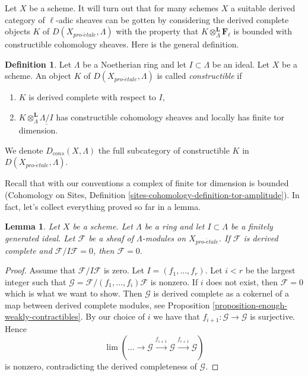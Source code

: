 \documentclass[10pt,a4paper]{amsart}
\theoremstyle{plain}
\newtheorem{lemma}[subsection]{Lemma}
\theoremstyle{definition}
\newtheorem{definition}[subsection]{Definition}
\theoremstyle{remark}
\numberwithin{equation}{subsection}
\def\lim{\mathop{\mathrm{lim}}\nolimits}
\def\proetale{{pro\text{-}\acute{e}tale}}
\begin{document}
\noindent
Let $X$ be a scheme. It will turn out that for many schemes $X$ a suitable
derived category of $\ell$-adic sheaves can be gotten by considering the
derived complete objects $K$ of $D(X_\proetale, \Lambda)$ with the property
that $K \otimes_\Lambda^\mathbf{L} \mathbf{F}_\ell$ is bounded with
constructible cohomology sheaves. Here is the general definition.

\begin{definition}
\label{definition-Dbc}
Let $\Lambda$ be a Noetherian ring and let $I \subset \Lambda$ be an ideal.
Let $X$ be a scheme. An object $K$ of $D(X_\proetale, \Lambda)$ is called
{\it constructible} if
\begin{enumerate}
\item $K$ is derived complete with respect to $I$,
\item $K \otimes_\Lambda^\mathbf{L} \underline{\Lambda/I}$
has constructible cohomology sheaves and locally has finite tor dimension.
\end{enumerate}
We denote $D_{cons}(X, \Lambda)$ the full subcategory of constructible
$K$ in $D(X_\proetale, \Lambda)$.
\end{definition}

\noindent
Recall that with our conventions a complex of finite tor dimension
is bounded (Cohomology on Sites, Definition
\ref{sites-cohomology-definition-tor-amplitude}).
In fact, let's collect everything proved so far in a lemma.

\begin{lemma}
\label{lemma-derived-complete-zero}
Let $X$ be a scheme. Let $\Lambda$ be a ring and let
$I \subset \Lambda$ be a finitely generated ideal.
Let $\mathcal{F}$ be a sheaf of $\Lambda$-modules on $X_\proetale$.
If $\mathcal{F}$ is derived complete and $\mathcal{F}/I\mathcal{F} = 0$,
then $\mathcal{F} = 0$.
\end{lemma}

\begin{proof}
Assume that $\mathcal{F}/I\mathcal{F}$ is zero.
Let $I = (f_1, \ldots, f_r)$. Let $i < r$ be the largest
integer such that $\mathcal{G} = \mathcal{F}/(f_1, \ldots, f_i)\mathcal{F}$
is nonzero. If $i$ does not exist, then $\mathcal{F} = 0$ which is what we
want to show. Then $\mathcal{G}$ is derived complete as a cokernel
of a map between derived complete modules, see
Proposition \ref{proposition-enough-weakly-contractibles}.
By our choice of $i$ we have that $f_{i + 1} : \mathcal{G} \to \mathcal{G}$
is surjective. Hence
$$
\lim (\ldots \to \mathcal{G} \xrightarrow{f_{i + 1}} \mathcal{G}
\xrightarrow{f_{i + 1}} \mathcal{G})
$$
is nonzero, contradicting the derived completeness of $\mathcal{G}$.
\end{proof}
\end{document}

